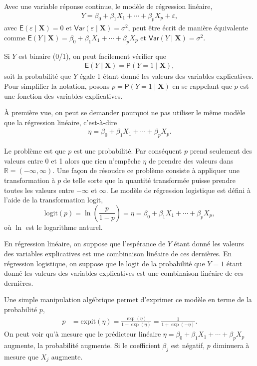 \documentclass[
  11pt,
  letterpaper,
]{book}
\theoremstyle{definition}
\theoremstyle{definition}
\theoremstyle{definition}
\theoremstyle{remark}
\begin{document}
Avec une variable réponse continue, le modèle de régression linéaire,
\begin{align*}
 Y = \beta_0 + \beta_1X_1 + \cdots + \beta_p X_p + \varepsilon,
\end{align*}
avec \({\mathsf E}\left(\varepsilon\mid \boldsymbol{X}\right)=0\) et \({\mathsf{Var}}\left(\varepsilon\mid \boldsymbol{X}\right)=\sigma^2\), peut être écrit de manière équivalente comme \({\mathsf E}\left(Y \mid \boldsymbol{X}\right) = \beta_0 + \beta_1X_1 + \cdots + \beta_pX_p\) et \({\mathsf{Var}}\left(Y \mid \boldsymbol{X}\right)=\sigma^2.\)

Si \(Y\) est binaire (0/1), on peut facilement vérifier que
\begin{align*}
{\mathsf E}\left(Y \mid \boldsymbol{X}\right) = {\mathsf P}\left(Y=1 \mid  \boldsymbol{X}\right),
\end{align*}
soit la probabilité que \(Y\) égale 1 étant donné les valeurs des variables explicatives. Pour simplifier la notation, posons \(p = {\mathsf P}\left(Y=1 \mid \boldsymbol{X}\right)\) en se rappelant que \(p\) est une fonction des variables explicatives.

À première vue, on peut se demander pourquoi ne pas utiliser le même modèle que la régression linéaire, c'est-à-dire
\begin{align*}
\eta=\beta_0 + \beta_1X_1 + \cdots + \beta_p X_p.
\end{align*}

Le problème est que \(p\) est une probabilité. Par conséquent \(p\) prend seulement des valeurs entre 0 et 1 alors que rien n'empêche \(\eta\) de prendre des valeurs dans \(\mathbb{R}=(-\infty, \infty)\). Une façon de résoudre ce problème consiste à appliquer une transformation à \(p\) de telle sorte que la quantité transformée puisse prendre toutes les valeurs entre \(-\infty\) et \(\infty\).
Le modèle de régression logistique est défini à l'aide de la transformation \(\mathrm{logit}\),
\[\mathrm{logit}(p) = \ln\left( \frac{p}{1-p}\right)=\eta=\beta_0 + \beta_1X_1 + \cdots + \beta_p X_p,\]
où \(\ln\) est le logarithme naturel.

En régression linéaire, on suppose que l'espérance de \(Y\) étant donné les valeurs des variables explicatives est une combinaison linéaire de ces dernières. En régression logistique, on suppose que le logit de la probabilité que \(Y=1\) étant donné les valeurs des variables explicatives est une combinaison linéaire de ces dernières.

Une simple manipulation algébrique permet d'exprimer ce modèle en terme de la probabilité \(p\),
\begin{align*}
 p &= \mathrm{expit}(\eta) = \frac{\exp(\eta)}{1+\exp(\eta)}
= \frac{1}{1+\exp(-\eta)}.
\end{align*}
On peut voir qu'à mesure que le prédicteur linéaire \(\eta=\beta_0+\beta_1X_1 + \cdots + \beta_pX_p\) augmente, la probabilité augmente.
Si le coefficient \(\beta_j\) est négatif, \(p\) diminuera à mesure que \(X_j\) augmente.
\end{document}

